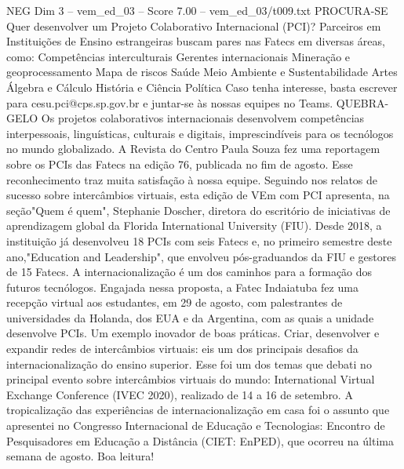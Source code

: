 \begin{textsample}{NEG Dim 3 – vem\_ed\_03 – Score 7.00 – vem\_ed\_03/t009.txt}  \label{ex:f3_neg_154}
PROCURA-SE Quer desenvolver um Projeto Colaborativo Internacional (PCI)?
Parceiros em Instituições de Ensino estrangeiras buscam pares nas Fatecs em diversas áreas, como: Competências interculturais Gerentes internacionais Mineração e geoprocessamento Mapa de riscos Saúde Meio Ambiente e Sustentabilidade Artes Álgebra e Cálculo História e Ciência Política Caso tenha interesse, basta escrever para cesu.pci@cps.sp.gov.br e juntar-se às nossas equipes no Teams.
QUEBRA-GELO Os projetos colaborativos internacionais desenvolvem competências interpessoais, linguísticas, culturais e digitais, imprescindíveis para os tecnólogos no mundo globalizado.
A Revista do Centro Paula Souza fez uma reportagem sobre os PCIs das Fatecs na edição 76, publicada no fim de agosto.
Esse reconhecimento traz muita satisfação à nossa equipe.
Seguindo nos relatos de sucesso sobre intercâmbios virtuais, esta edição de VEm com PCI apresenta, na seção"Quem é quem", Stephanie Doscher, diretora do escritório de iniciativas de aprendizagem global da Florida International University (FIU).
Desde 2018, a instituição já desenvolveu 18 PCIs com seis Fatecs e, no primeiro semestre deste ano,"Education and Leadership", que envolveu pós-graduandos da FIU e gestores de 15 Fatecs.
A internacionalização é um dos caminhos para a formação dos futuros tecnólogos.
Engajada nessa proposta, a Fatec Indaiatuba fez uma recepção virtual aos estudantes, em 29 de agosto, com palestrantes de universidades da Holanda, dos EUA e da Argentina, com as quais a unidade desenvolve PCIs.
Um exemplo inovador de boas práticas.
Criar, desenvolver e expandir redes de intercâmbios virtuais: eis um dos principais desafios da internacionalização do ensino superior.
Esse foi um dos temas que debati no principal evento sobre intercâmbios virtuais do mundo: International Virtual Exchange Conference (IVEC 2020), realizado de 14 a 16 de setembro.
A tropicalização das experiências de internacionalização em casa foi o assunto que apresentei no Congresso Internacional de Educação e Tecnologias: Encontro de Pesquisadores em Educação a Distância (CIET: EnPED), que ocorreu na última semana de agosto.
Boa leitura!

\end{textsample}
